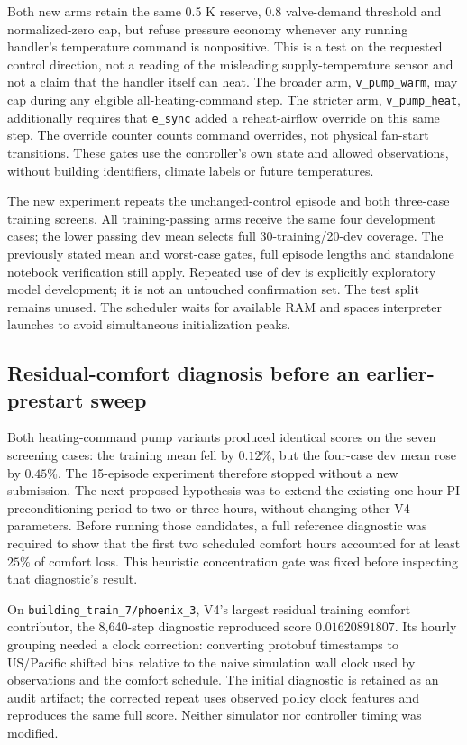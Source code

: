 Both new arms retain the same 0.5 K reserve, 0.8 valve-demand threshold and
normalized-zero cap, but refuse pressure economy whenever any running
handler's temperature command is nonpositive. This is a test on the requested
control direction, not a reading of the misleading supply-temperature sensor
and not a claim that the handler itself can heat. The broader arm,
\texttt{v\_pump\_warm}, may cap during any eligible all-heating-command step.
The stricter arm, \texttt{v\_pump\_heat}, additionally requires that
\texttt{e\_sync} added a reheat-airflow override on this same step. The override
counter counts command overrides, not physical fan-start transitions.
These gates use the controller's own state and allowed observations, without
building identifiers, climate labels or future temperatures.

The new experiment repeats the unchanged-control episode and both three-case
training screens. All training-passing arms receive the same four development
cases; the lower passing dev mean selects full 30-training/20-dev coverage.
The previously stated mean and worst-case gates, full episode lengths and
standalone notebook verification still apply. Repeated use of dev is explicitly
exploratory model development; it is not an untouched confirmation set.
The test split remains unused. The scheduler waits for available RAM and spaces
interpreter launches to avoid simultaneous initialization peaks.



\subsection{Residual-comfort diagnosis before an earlier-prestart sweep}
Both heating-command pump variants produced identical scores on the seven
screening cases: the training mean fell by $0.12\%$, but the four-case dev mean
rose by $0.45\%$. The 15-episode experiment therefore stopped without a new
submission. The next proposed hypothesis was to extend the existing one-hour
PI preconditioning period to two or three hours, without changing other V4
parameters. Before running those candidates, a full reference diagnostic was
required to show that the first two scheduled comfort hours accounted for
at least $25\%$ of comfort loss. This heuristic concentration gate was fixed
before inspecting that diagnostic's result.

On \texttt{building\_train\_7/phoenix\_3}, V4's largest residual training
comfort contributor, the 8,640-step diagnostic reproduced score
$0.01620891807$. Its hourly grouping needed a clock correction: converting
protobuf timestamps to US/Pacific shifted bins relative to the naive simulation
wall clock used by observations and the comfort schedule. The initial diagnostic
is retained as an audit artifact; the corrected repeat uses observed policy
clock features and reproduces the same full score. Neither simulator nor
controller timing was modified.

